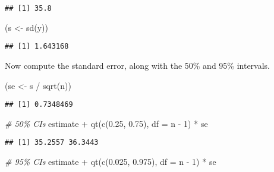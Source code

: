 \documentclass[
]{article}
\newenvironment{Shaded}{\begin{snugshade}}{\end{snugshade}}
\newcommand{\AttributeTok}[1]{\textcolor[rgb]{0.77,0.63,0.00}{#1}}
\newcommand{\CommentTok}[1]{\textcolor[rgb]{0.56,0.35,0.01}{\textit{#1}}}
\newcommand{\DecValTok}[1]{\textcolor[rgb]{0.00,0.00,0.81}{#1}}
\newcommand{\FloatTok}[1]{\textcolor[rgb]{0.00,0.00,0.81}{#1}}
\newcommand{\FunctionTok}[1]{\textcolor[rgb]{0.00,0.00,0.00}{#1}}
\newcommand{\NormalTok}[1]{#1}
\newcommand{\OtherTok}[1]{\textcolor[rgb]{0.56,0.35,0.01}{#1}}
\newcommand{\SpecialCharTok}[1]{\textcolor[rgb]{0.00,0.00,0.00}{#1}}
\begin{document}
\begin{verbatim}
## [1] 35.8
\end{verbatim}

\begin{Shaded}
\begin{Highlighting}[]
\NormalTok{(s }\OtherTok{\textless{}{-}} \FunctionTok{sd}\NormalTok{(y))}
\end{Highlighting}
\end{Shaded}

\begin{verbatim}
## [1] 1.643168
\end{verbatim}

Now compute the standard error, along with the 50\% and 95\% intervals.

\begin{Shaded}
\begin{Highlighting}[]
\NormalTok{(se }\OtherTok{\textless{}{-}}\NormalTok{ s }\SpecialCharTok{/} \FunctionTok{sqrt}\NormalTok{(n))}
\end{Highlighting}
\end{Shaded}

\begin{verbatim}
## [1] 0.7348469
\end{verbatim}

\begin{Shaded}
\begin{Highlighting}[]
\CommentTok{\# 50\% CIs}
\NormalTok{estimate }\SpecialCharTok{+} \FunctionTok{qt}\NormalTok{(}\FunctionTok{c}\NormalTok{(}\FloatTok{0.25}\NormalTok{, }\FloatTok{0.75}\NormalTok{), }\AttributeTok{df =}\NormalTok{ n }\SpecialCharTok{{-}} \DecValTok{1}\NormalTok{) }\SpecialCharTok{*}\NormalTok{ se}
\end{Highlighting}
\end{Shaded}

\begin{verbatim}
## [1] 35.2557 36.3443
\end{verbatim}

\begin{Shaded}
\begin{Highlighting}[]
\CommentTok{\# 95\% CIs}
\NormalTok{estimate }\SpecialCharTok{+} \FunctionTok{qt}\NormalTok{(}\FunctionTok{c}\NormalTok{(}\FloatTok{0.025}\NormalTok{, }\FloatTok{0.975}\NormalTok{), }\AttributeTok{df =}\NormalTok{ n }\SpecialCharTok{{-}} \DecValTok{1}\NormalTok{) }\SpecialCharTok{*}\NormalTok{ se}
\end{Highlighting}
\end{Shaded}
\end{document}
